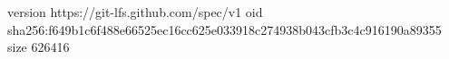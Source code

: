 version https://git-lfs.github.com/spec/v1
oid sha256:f649b1c6f488e66525ec16cc625e033918c274938b043cfb3c4c916190a89355
size 626416
